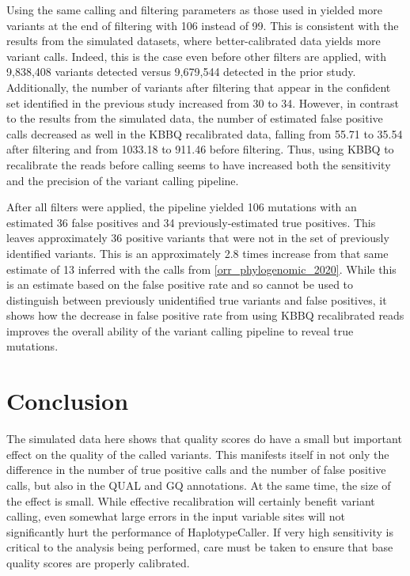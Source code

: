 \documentclass{report}
\begin{document}
\begin{outline}
\item Using the same calling and filtering parameters as those used in \cite{orr_phylogenomic_2020} yielded more variants at the end of filtering with 106 instead of 99. This is consistent with the results from the simulated datasets, where better-calibrated data yields more variant calls. Indeed, this is the case even before other filters are applied, with 9,838,408 variants detected versus 9,679,544 detected in the prior study. Additionally, the number of variants after filtering that appear in the confident set identified in the previous study increased from 30 to 34. However, in contrast to the results from the simulated data, the number of estimated false positive calls decreased as well in the KBBQ recalibrated data, falling from 55.71 to 35.54 after filtering and from 1033.18 to 911.46 before filtering. Thus, using KBBQ to recalibrate the reads before calling seems to have increased both the sensitivity and the precision of the variant calling pipeline.

\item After all filters were applied, the pipeline yielded 106 mutations with an estimated 36 false positives and 34 previously-estimated true positives. This leaves approximately 36 positive variants that were not in the set of previously identified variants. This is an approximately 2.8 times increase from that same estimate of 13 inferred with the calls from \ref{orr_phylogenomic_2020}. While this is an estimate based on the false positive rate and so cannot be used to distinguish between previously unidentified true variants and false positives, it shows how the decrease in false positive rate from using KBBQ recalibrated reads improves the overall ability of the variant calling pipeline to reveal true mutations.



\end{outline}

\section{Conclusion}

The simulated data here shows that quality scores do have a small but important effect on the quality of the called variants. This manifests itself in not only the difference in the number of true positive calls and the number of false positive calls, but also in the QUAL and GQ annotations. At the same time, the size of the effect is small. While effective recalibration will certainly benefit variant calling, even somewhat large errors in the input variable sites will not significantly hurt the performance of HaplotypeCaller. If very high sensitivity is critical to the analysis being performed, care must be taken to ensure that base quality scores are properly calibrated.

\printbibliography
\end{document}
